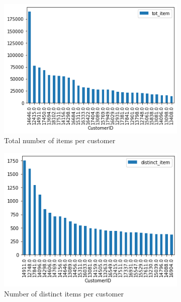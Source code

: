 \begin{figure}[h!]
\captionsetup{justification=centering}
\begin{subfigure}{.3\textwidth}
\centering
\includegraphics[width=\textwidth]{img/tot_item.png}
\caption{Total number of items per customer}
\label{fig:tot_item}
\end{subfigure}
\begin{subfigure}{.3\textwidth}
\centering
\includegraphics[width=\textwidth]{img/distinct_item.png}
\caption{Number of distinct items per customer}
\label{ref:distinct_item}
\end{subfigure}
\begin{subfigure}{.3\textwidth}
\centering

\end{subfigure}
\end{figure}
